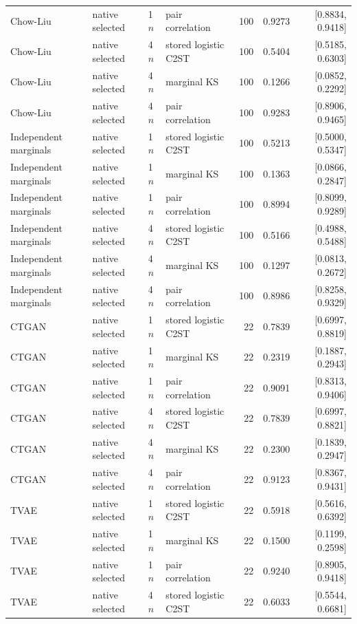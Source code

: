 \begin{longtable}{llllrrr}
Chow-Liu & native selected & 1$n$ & pair correlation & 100 & 0.9273 & [0.8834, 0.9418] \\
Chow-Liu & native selected & 4$n$ & stored logistic C2ST & 100 & 0.5404 & [0.5185, 0.6303] \\
Chow-Liu & native selected & 4$n$ & marginal KS & 100 & 0.1266 & [0.0852, 0.2292] \\
Chow-Liu & native selected & 4$n$ & pair correlation & 100 & 0.9283 & [0.8906, 0.9465] \\
Independent marginals & native selected & 1$n$ & stored logistic C2ST & 100 & 0.5213 & [0.5000, 0.5347] \\
Independent marginals & native selected & 1$n$ & marginal KS & 100 & 0.1363 & [0.0866, 0.2847] \\
Independent marginals & native selected & 1$n$ & pair correlation & 100 & 0.8994 & [0.8099, 0.9289] \\
Independent marginals & native selected & 4$n$ & stored logistic C2ST & 100 & 0.5166 & [0.4988, 0.5488] \\
Independent marginals & native selected & 4$n$ & marginal KS & 100 & 0.1297 & [0.0813, 0.2672] \\
Independent marginals & native selected & 4$n$ & pair correlation & 100 & 0.8986 & [0.8258, 0.9329] \\
CTGAN & native selected & 1$n$ & stored logistic C2ST & 22 & 0.7839 & [0.6997, 0.8819] \\
CTGAN & native selected & 1$n$ & marginal KS & 22 & 0.2319 & [0.1887, 0.2943] \\
CTGAN & native selected & 1$n$ & pair correlation & 22 & 0.9091 & [0.8313, 0.9406] \\
CTGAN & native selected & 4$n$ & stored logistic C2ST & 22 & 0.7839 & [0.6997, 0.8821] \\
CTGAN & native selected & 4$n$ & marginal KS & 22 & 0.2300 & [0.1839, 0.2947] \\
CTGAN & native selected & 4$n$ & pair correlation & 22 & 0.9123 & [0.8367, 0.9431] \\
TVAE & native selected & 1$n$ & stored logistic C2ST & 22 & 0.5918 & [0.5616, 0.6392] \\
TVAE & native selected & 1$n$ & marginal KS & 22 & 0.1500 & [0.1199, 0.2598] \\
TVAE & native selected & 1$n$ & pair correlation & 22 & 0.9240 & [0.8905, 0.9418] \\
TVAE & native selected & 4$n$ & stored logistic C2ST & 22 & 0.6033 & [0.5544, 0.6681] \\

\end{longtable}
